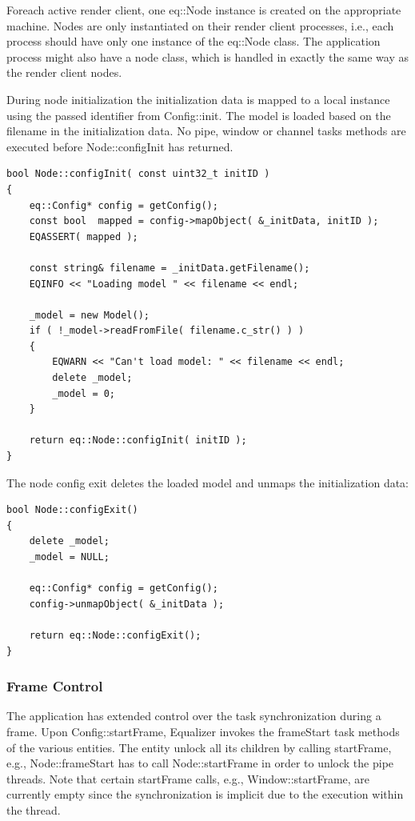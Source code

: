 \documentclass[10pt,a4]{scrartcl}
\begin{document}
Foreach active render client, one \textsf{eq::Node} instance is
created on the appropriate machine. Nodes are only instantiated on their
render client processes, i.e., each process should have only one
instance of the \textsf{eq::Node} class. The application process might
also have a node class, which is handled in exactly the same way as the
render client nodes.

During node initialization the initialization data is mapped to
a local instance using the passed identifier from
\textsf{Config::init}. The model is loaded based on the filename in the
initialization data. No pipe, window or channel tasks methods are
executed before \textsf{Node::configInit} has returned.

{\footnotesize\begin{lstlisting}
bool Node::configInit( const uint32_t initID )
{
    eq::Config* config = getConfig();
    const bool  mapped = config->mapObject( &_initData, initID );
    EQASSERT( mapped );

    const string& filename = _initData.getFilename();
    EQINFO << "Loading model " << filename << endl;

    _model = new Model();
    if ( !_model->readFromFile( filename.c_str() ) )
    {
        EQWARN << "Can't load model: " << filename << endl;
        delete _model;
        _model = 0;
    }
    
    return eq::Node::configInit( initID );
}
\end{lstlisting}}%

The node config exit deletes the loaded model and unmaps the
initialization data: 

{\footnotesize\begin{lstlisting}
bool Node::configExit()
{
    delete _model;
    _model = NULL;

    eq::Config* config = getConfig();
    config->unmapObject( &_initData );

    return eq::Node::configExit();
}
\end{lstlisting}}

\subsubsection{Frame Control}

The application has extended control over the task synchronization
during a frame. Upon \textsf{Config::startFrame}, Equalizer invokes the
\textsf{frameStart} task methods of the various entities. The entity
unlock all its children by calling \textsf{startFrame}, e.g.,
\textsf{Node::frameStart} has to call \textsf{Node::startFrame} in order
to unlock the pipe threads. Note that certain \textsf{startFrame} calls,
e.g., \textsf{Window::startFrame}, are currently empty since the
synchronization is implicit due to the execution within the thread.
\end{document}
